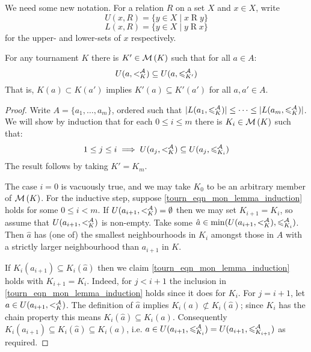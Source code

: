 We need some new notation. For a relation $R$ on a set $X$ and $x \in X$, write
\[ U(x, R) = \{y \in X \mid x \mathrel{R} y\} \]
\[ L(x, R) = \{y \in X \mid y \mathrel{R} x\} \]
for the upper- and lower-sets of $x$ respectively.

\begin{lemma}
    \label{tourn_result_chainmin_mon_extend_strict_part}
    For any tournament $K$ there is $K' \in \operatorname{\mathcal{M}}\left({K}\right)$ such that for all $a \in
    A$:
    \[
        U(a, {<^{\mathcal{A}}_K}) \subseteq U(a, {\leqslant^{\mathcal{A}}_{K'}})
    \]
    That is, $K(a) \subset K(a')$ implies $K'(a) \subseteq K'(a')$ for all $a,
    a' \in A$.
\end{lemma}

\begin{proof}
    Write $A = \{a_1,\ldots,a_m\}$, ordered such that $|L(a_1, {\leqslant^{\mathcal{A}}_K})| \le
    \cdots \le |L(a_m, {\leqslant^{\mathcal{A}}_K})|$. We will show by induction that for each $0
    \le i \le m$ there is $K_i \in \operatorname{\mathcal{M}}\left({K}\right)$ such that:
    \begin{equation}
        1 \le j \le i
        \implies
        U(a_j, {<^{\mathcal{A}}_K}) \subseteq U(a_j, {\leqslant^{\mathcal{A}}_{K_i}})
        \label{tourn_eqn_mon_lemma_induction}
    \end{equation}
    The result follows by taking $K' = K_m$.

    The case $i=0$ is vacuously true, and we may take $K_0$ to be an arbitrary
    member of $\operatorname{\mathcal{M}}\left({K}\right)$. For the inductive step, suppose
    \cref{tourn_eqn_mon_lemma_induction} holds for some $0 \le i < m$. If
    $U(a_{i+1}, {<^{\mathcal{A}}_K}) = \emptyset$ then we may set $K_{i+1} = K_i$, so
    assume that $U(a_{i+1}, {<^{\mathcal{A}}_K})$ is non-empty. Take some $\hat{a} \in
    \min(U(a_{i+1}, {<^{\mathcal{A}}_K}), {\leqslant^{\mathcal{A}}_{K_i}})$. Then $\hat{a}$ has (one of)
    the smallest neighbourhoods in $K_i$ amongst those in $A$ with a strictly
    larger neighbourhood than $a_{i+1}$ in $K$.

    If $K_i(a_{i+1}) \subseteq K_i(\hat{a})$ then we claim
    \cref{tourn_eqn_mon_lemma_induction} holds with $K_{i+1} = K_i$. Indeed, for
    $j < i + 1$ the inclusion in \cref{tourn_eqn_mon_lemma_induction} holds
    since it does for $K_i$. For $j = i+1$, let $a \in U(a_{i+1}, {<^{\mathcal{A}}_K})$.
    The definition of $\hat{a}$ implies $K_i(a) \not\subset K_i(\hat{a})$;
    since $K_i$ has the chain property this means $K_i(\hat{a}) \subseteq
    K_i(a)$. Consequently $K_i(a_{i+1}) \subseteq K_i(\hat{a}) \subseteq
    K_i(a)$, i.e. $a \in U(a_{i+1}, {\leqslant^{\mathcal{A}}_{K_i}}) = U(a_{i+1},
    {\leqslant^{\mathcal{A}}_{K_{i+1}}})$ as required.


\end{proof}
